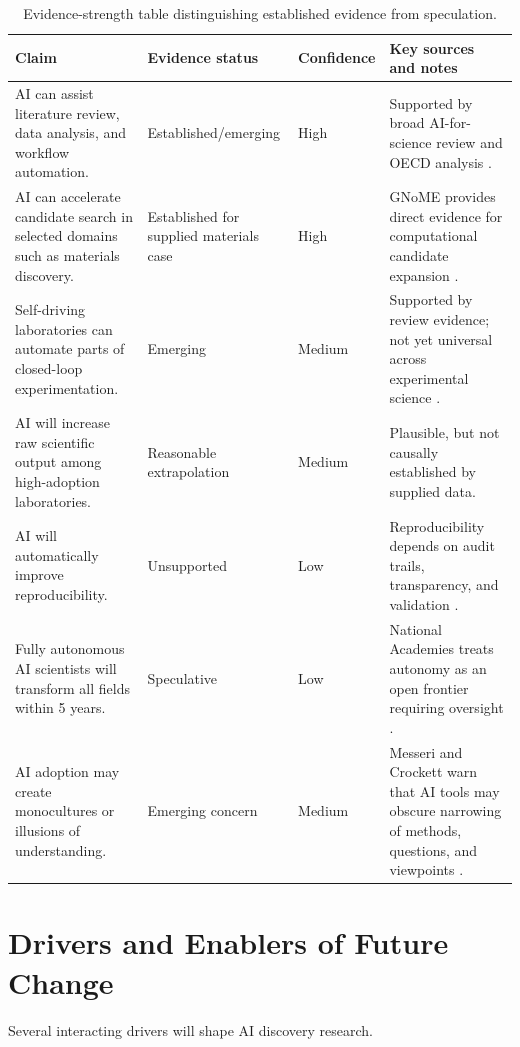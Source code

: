 \documentclass[12pt]{article}
\begin{document}
\begin{table}[H]
\centering
\caption{Evidence-strength table distinguishing established evidence from speculation.}
\small
\begin{tabularx}{\textwidth}{X p{3cm}p{2cm}X}
\toprule
\textbf{Claim} & \textbf{Evidence status} & \textbf{Confidence} & \textbf{Key sources and notes} \\
\midrule
AI can assist literature review, data analysis, and workflow automation. & Established/emerging & High & Supported by broad AI-for-science review and OECD analysis \cite{ref1,ref2}. \\
AI can accelerate candidate search in selected domains such as materials discovery. & Established for supplied materials case & High & GNoME provides direct evidence for computational candidate expansion \cite{ref6}. \\
Self-driving laboratories can automate parts of closed-loop experimentation. & Emerging & Medium & Supported by review evidence; not yet universal across experimental science \cite{ref5}. \\
AI will increase raw scientific output among high-adoption laboratories. & Reasonable extrapolation & Medium & Plausible, but not causally established by supplied data. \\
AI will automatically improve reproducibility. & Unsupported & Low & Reproducibility depends on audit trails, transparency, and validation \cite{ref4,ref8}. \\
Fully autonomous AI scientists will transform all fields within 5 years. & Speculative & Low & National Academies treats autonomy as an open frontier requiring oversight \cite{ref3}. \\
AI adoption may create monocultures or illusions of understanding. & Emerging concern & Medium & Messeri and Crockett warn that AI tools may obscure narrowing of methods, questions, and viewpoints \cite{ref8}. \\
\bottomrule
\end{tabularx}
\end{table}

\section{Drivers and Enablers of Future Change}

Several interacting drivers will shape AI discovery research.
\end{document}

